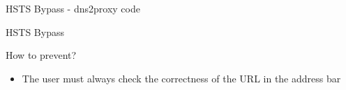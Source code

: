 \documentclass{beamer}
\begin{document}
\begin{frame}{HSTS Bypass - dns2proxy code}
\end{frame}

\begin{frame}{HSTS Bypass}

  \begin{block}{How to prevent?}
    \begin{itemize}
      \pause
      \item The user must always check the correctness of the URL in the address bar
    \end{itemize}
  \end{block}
\end{frame}
\end{document}
